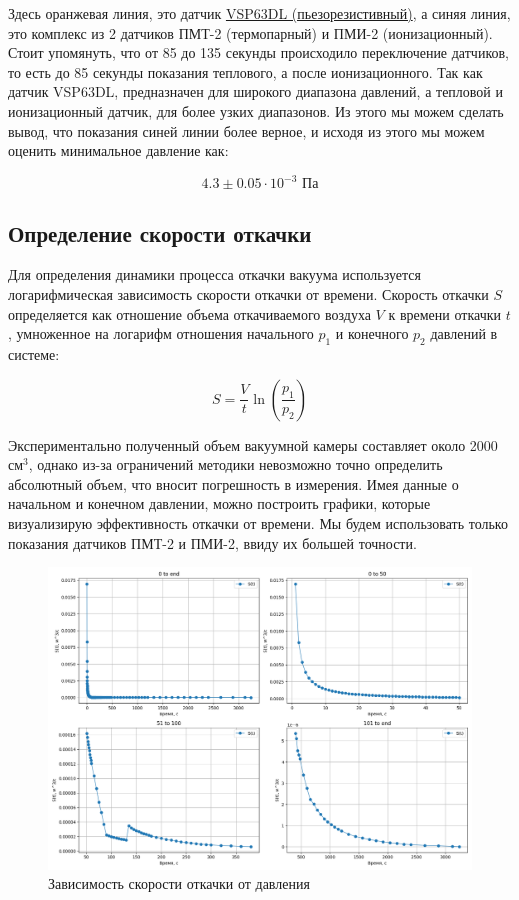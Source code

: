 \documentclass[12pt,oneside,a4paper]{article}
\begin{document}
Здесь оранжевая линия, это датчик \href{https://thyracont-vacuum.com/en/artikelnummer/dn-16-iso-kf-vsp63dl-en/}{VSP63DL (пьезорезистивный)}, а синяя линия, это комплекс из 2 датчиков ПМТ-2 (термопарный) и ПМИ-2 (ионизационный). Стоит упомянуть, что от 85 до 135 секунды происходило переключение датчиков, то есть до 85 секунды показания теплового, а после ионизационного. Так как датчик VSP63DL, предназначен для широкого диапазона давлений,  а тепловой и ионизационный датчик, для более узких диапазонов. Из этого мы можем сделать вывод, что показания синей линии более верное, и исходя из этого мы можем оценить минимальное давление как:

$$4.3 \pm 0.05 \cdot 10^{-3} \textbf{ Па}$$

\subsection{Определение скорости откачки}

Для определения динамики процесса откачки вакуума используется логарифмическая зависимость скорости откачки от времени. Скорость откачки \( S \) определяется как отношение объема откачиваемого воздуха \( V \) к времени откачки \( t \), умноженное на логарифм отношения начального \( p_1 \) и конечного \( p_2 \) давлений в системе:

\begin{equation}
S = \frac{V}{t} \ln\left(\frac{p_1}{p_2}\right)
\end{equation}

Экспериментально полученный объем вакуумной камеры составляет около 2000 см\(^3\), однако из-за ограничений методики невозможно точно определить абсолютный объем, что вносит погрешность в измерения. Имея данные о начальном и конечном давлении, можно построить графики, которые визуализирую эффективность откачки от времени. Мы будем использовать только показания датчиков ПМТ-2 и ПМИ-2, ввиду их большей точности.


\begin{figure}[!ht]
    \centering
    \includegraphics[width=1\linewidth]{garf_2.png}
    \caption{Зависимость скорости откачки от давления}
    \label{fig:enter-label3}
\end{figure}
\end{document}
